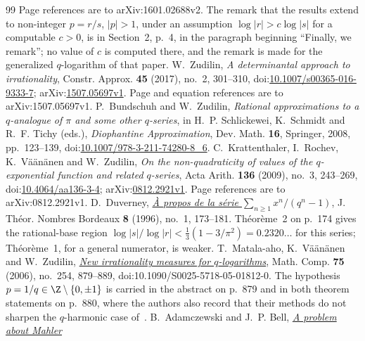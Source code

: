 \begin{thebibliography}{99}
  Page references are to arXiv:1601.02688v2.
  The remark that the results extend to non-integer \(p=r/s\), \(|p|>1\), under
  an assumption \(\log|r|>c\log|s|\) for a computable \(c>0\), is in Section~2,
  p.~4, in the paragraph beginning ``Finally, we remark''; no value of \(c\) is
  computed there, and the remark is made for the generalized \(q\)-logarithm of
  that paper.
 W.~Zudilin, \emph{A determinantal approach to
  irrationality}, Constr. Approx. \textbf{45} (2017), no.~2, 301--310,
  doi:\href{https://doi.org/10.1007/s00365-016-9333-7}{10.1007/s00365-016-9333-7};
  arXiv:\href{https://arxiv.org/abs/1507.05697v1}{1507.05697v1}.
  Page and equation references are to arXiv:1507.05697v1.
 P.~Bundschuh and W.~Zudilin, \emph{Rational
  approximations to a \(q\)-analogue of \(\pi\) and some other \(q\)-series},
  in H.~P. Schlickewei, K.~Schmidt and R.~F. Tichy (eds.), \emph{Diophantine
  Approximation}, Dev. Math. \textbf{16}, Springer, 2008, pp.~123--139,
  doi:\href{https://doi.org/10.1007/978-3-211-74280-8_6}{10.1007/978-3-211-74280-8\_6}.
 C.~Krattenthaler, I.~Rochev, K.~V\"a\"an\"anen and
  W.~Zudilin, \emph{On the non-quadraticity of values of the
  \(q\)-exponential function and related \(q\)-series}, Acta Arith.
  \textbf{136} (2009), no.~3, 243--269,
  doi:\href{https://doi.org/10.4064/aa136-3-4}{10.4064/aa136-3-4};
  arXiv:\href{https://arxiv.org/abs/0812.2921v1}{0812.2921v1}.
  Page references are to arXiv:0812.2921v1.
 D.~Duverney,
  \href{https://numdam.org/item/JTNB_1996__8_1_173_0.pdf}{\emph{\`A propos de la
  s\'erie $\sum_{n\ge1}x^{n}/(q^{n}-1)$}},
  J. Th\'eor. Nombres Bordeaux \textbf{8} (1996), no.~1, 173--181.
  Th\'eor\`eme~2 on p.~174 gives the rational-base region
  $\log|s|/\log|r|<\frac13(1-3/\pi^{2})=0.2320\ldots$ for this series;
  Th\'eor\`eme~1, for a general numerator, is weaker.
 T.~Matala-aho, K.~V\"a\"an\"anen and W.~Zudilin,
  \href{https://doi.org/10.1090/S0025-5718-05-01812-0}{\emph{New irrationality
  measures for \(q\)-logarithms}}, Math. Comp. \textbf{75} (2006), no.~254,
  879--889, doi:10.1090/S0025-5718-05-01812-0.  The hypothesis
  \(p=1/q\in\Z\mathbin{\backslash}\{0,\pm1\}\) is carried in the abstract on p.~879 and in
  both theorem statements on p.~880, where the authors also record that their
  methods do not sharpen the \(q\)-harmonic case of~\cite{zudilin2004}.
 B.~Adamczewski and J.~P. Bell,
  \href{https://arxiv.org/abs/1303.2019v1}{\emph{A problem about Mahler
}}
\end{thebibliography}
